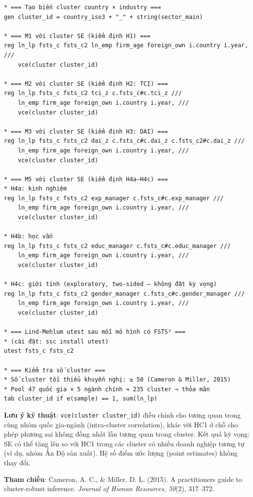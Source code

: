 \documentclass[12pt,a4paper]{article}
\begin{document}
\begin{verbatim}
* === Tạo biến cluster country × industry ===
gen cluster_id = country_iso3 + "_" + string(sector_main)

* === M1 với cluster SE (kiểm định H1) ===
reg ln_lp fsts_c fsts_c2 ln_emp firm_age foreign_own i.country i.year, ///
    vce(cluster cluster_id)

* === M2 với cluster SE (kiểm định H2: TCI) ===
reg ln_lp fsts_c fsts_c2 tci_z c.fsts_c#c.tci_z ///
    ln_emp firm_age foreign_own i.country i.year, ///
    vce(cluster cluster_id)

* === M3 với cluster SE (kiểm định H3: DAI) ===
reg ln_lp fsts_c fsts_c2 dai_z c.fsts_c#c.dai_z c.fsts_c2#c.dai_z ///
    ln_emp firm_age foreign_own i.country i.year, ///
    vce(cluster cluster_id)

* === M5 với cluster SE (kiểm định H4a–H4c) ===
* H4a: kinh nghiệm
reg ln_lp fsts_c fsts_c2 exp_manager c.fsts_c#c.exp_manager ///
    ln_emp firm_age foreign_own i.country i.year, ///
    vce(cluster cluster_id)

* H4b: học vấn
reg ln_lp fsts_c fsts_c2 educ_manager c.fsts_c#c.educ_manager ///
    ln_emp firm_age foreign_own i.country i.year, ///
    vce(cluster cluster_id)

* H4c: giới tính (exploratory, two-sided — không đặt kỳ vọng)
reg ln_lp fsts_c fsts_c2 gender_manager c.fsts_c#c.gender_manager ///
    ln_emp firm_age foreign_own i.country i.year, ///
    vce(cluster cluster_id)

* === Lind-Mehlum utest sau mỗi mô hình có FSTS² ===
* (cài đặt: ssc install utest)
utest fsts_c fsts_c2

* === Kiểm tra số cluster ===
* Số cluster tối thiểu khuyến nghị: ≥ 50 (Cameron & Miller, 2015)
* Pool 47 quốc gia × 5 ngành chính ≈ 235 cluster → thỏa mãn
tab cluster_id if e(sample) == 1, sum(ln_lp)
\end{verbatim}

\textbf{Lưu ý kỹ thuật}: \texttt{vce(cluster\ cluster\_id)} điều chỉnh
cho tương quan trong cùng nhóm quốc gia-ngành (intra-cluster
correlation), khác với HC1 ở chỗ cho phép phương sai không đồng nhất lẫn
tương quan trong cluster. Kết quả kỳ vọng: SE có thể tăng lên so với HC1
trong các cluster có nhiều doanh nghiệp tương tự (ví dụ, nhóm Ấn Độ sản
xuất). Hệ số điểm ước lượng (point estimates) không thay đổi.

\textbf{Tham chiếu}: Cameron, A. C., \& Miller, D. L. (2015). A
practitioner\textquotesingle s guide to cluster-robust inference.
\emph{Journal of Human Resources, 50}(2), 317--372.
\end{document}
